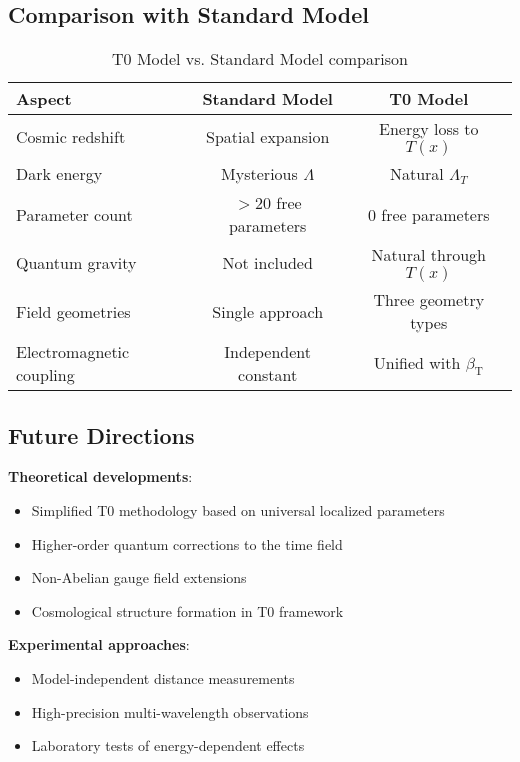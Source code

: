 \documentclass[12pt,a4paper]{article}
\newcommand{\betaT}{\beta_{\text{T}}}
\begin{document}
	\subsection{Comparison with Standard Model}
	\label{subsec:standard_model_comparison}
	
	\begin{table}[htbp]
		\centering
		\begin{tabular}{|l|c|c|}
			\hline
			\textbf{Aspect} & \textbf{Standard Model} & \textbf{T0 Model} \\
			\hline
			Cosmic redshift & Spatial expansion & Energy loss to $T(x)$ \\
			Dark energy & Mysterious $\Lambda$ & Natural $\Lambda_T$ \\
			Parameter count & $>20$ free parameters & 0 free parameters \\
			Quantum gravity & Not included & Natural through $T(x)$ \\
			Field geometries & Single approach & Three geometry types \\
			Electromagnetic coupling & Independent constant & Unified with $\betaT$ \\
			\hline
		\end{tabular}
		\caption{T0 Model vs. Standard Model comparison}
	\end{table}
	
	\subsection{Future Directions}
	\label{subsec:future_directions}
	
	\textbf{Theoretical developments}:

	
	\begin{itemize}
			\item Simplified T0 methodology based on universal localized parameters
		\item Higher-order quantum corrections to the time field
		\item Non-Abelian gauge field extensions
		\item Cosmological structure formation in T0 framework
	\end{itemize}
	
	\textbf{Experimental approaches}:
	\begin{itemize}
		\item Model-independent distance measurements
		\item High-precision multi-wavelength observations
		\item Laboratory tests of energy-dependent effects
	\end{itemize}
	
\end{document}
